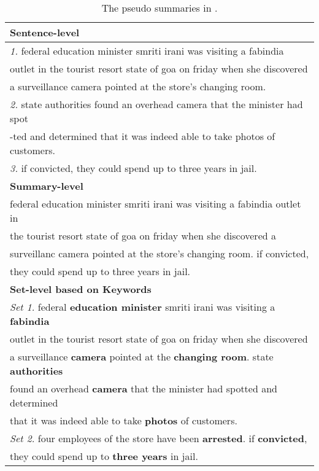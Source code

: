 \begin{table}[th]
	\begin{center}
		\scriptsize
		\begin{tabular}{|l|}%
			\hline \bf Sentence-level \\
			\hline \textit{1.} federal education minister smriti irani was visiting a fabindia \\
			outlet in the tourist resort state of goa on friday when she discovered \\
			a surveillance camera pointed at the store's changing room. \\ 
			\textit{2.} state authorities found an overhead camera that the minister had spot\\
			-ted and determined that it was indeed able to take photos of customers. \\
			\textit{3.} if convicted, they could spend up to three years in jail. \\
			\hline \bf Summary-level \\
			\hline federal education minister smriti irani was visiting a fabindia outlet in \\
			the tourist resort state of goa on friday when she discovered a \\
			surveillanc camera pointed at the store's changing room. if convicted,  \\
			they could spend up to three years in jail. \\
			\hline \bf Set-level based on Keywords\\
			\hline \textit{Set 1.} federal \textbf{education minister} smriti irani was visiting a \textbf{fabindia} \\
			outlet in the tourist resort state of goa on friday when she discovered \\
			a surveillance \textbf{camera} pointed at the \textbf{changing room}. state \textbf{authorities} \\ 
			found an overhead \textbf{camera} that the minister had spotted and determined \\
			that it was indeed able to take \textbf{photos} of customers. \\
			\textit{Set 2.} four employees of the store have been \textbf{arrested}. if \textbf{convicted}, \\
			they could spend up to \textbf{three years} in jail. \\
			\hline
		\end{tabular}
	\end{center}
	\caption{\label{tab:align_exp} The pseudo summaries
		in .}
\end{table}

